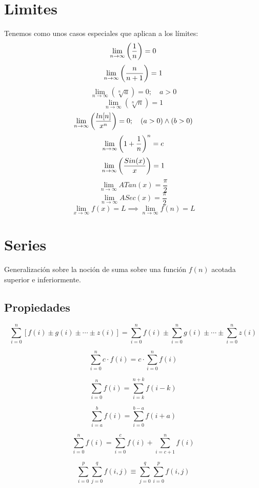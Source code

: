 \documentclass[tikz,11pt,fleqn]{book} %
\begin{document}
\section{Limites}
Tenemos como unos casos especiales que aplican a los límites:
$$
\lim_{n\to\infty}\left( \frac1n \right)=0
$$
$$
\lim_{n\to\infty}\left( \frac n{n+1} \right)=1
$$
$$
\lim_{n\to\infty}(\sqrt[n]{a})=0;\quad a>0
$$
$$
\lim_{n\to\infty}(\sqrt[n]{n})=1
$$
$$
\lim_{n\to\infty}\left( \frac{ln[n]}{x^n} \right)=0;\quad(a>0)\land (b>0)
$$
$$
\lim_{n\to\infty}\left( 1+\frac1n \right)^n=e
$$
$$
\lim_{n\to\infty}\left( \frac{Sin(x)}x \right)=1
$$
$$
\lim_{n\to\infty}ATan(x)=\frac{\pi}2
$$
$$
\lim_{n\to\infty}ASec(x)=\frac{\pi}2
$$
$$
\lim_{x\to\infty}f(x)=L
\implies
\lim_{n\to\infty}f(n)=L
$$

\section{Series}
Generalización sobre la noción de suma sobre una función $f(n)$ acotada superior e inferiormente.

\subsection{Propiedades}
\begin{theorem}
    $$
    \sum_{i=0}^n[f(i)\pm g(i)\pm\cdots\pm z(i)]
    = \sum_{i=0}^nf(i)\pm \sum_{i=0}^ng(i)\pm\cdots\pm\sum_{i=0}^nz(i) 
    $$
\end{theorem}

\begin{theorem}[Constantes]
    $$ \sum_{i=0}^nc\cdot f(i) = c\cdot\sum_{i=0}^nf(i) $$
\end{theorem}

\begin{theorem}
    $$ \sum_{i=0}^nf(i) = \sum_{i=k}^{n+k}f(i-k) $$
\end{theorem}

\begin{theorem}[Índice a 0]
    $$ \sum_{i=a}^bf(i) = \sum_{i=0}^{b-a}f(i+a) $$
\end{theorem}

\begin{theorem}[Partición]
    $$ \sum_{i=0}^nf(i) = \sum_{i=0}^cf(i)+\sum_{i=c+1}^nf(i) $$
\end{theorem}

\begin{theorem}[Dobles]
    $$
    \sum_{i=0}^p\sum_{j=0}^qf(i,j)
    \equiv \sum_{j=0}^q\sum_{i=0}^pf(i,j)
    $$
\end{theorem}
\end{document}
